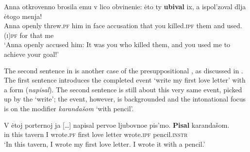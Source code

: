 \documentclass[output=paper,modfonts,newtxmath,hidelinks]{langscibook}
\begin{document}
\ea\gll	Anna otkrovenno brosila emu v lico obvinenie: \.{e}to ty \textbf{ubival} ix, a ispol'zoval dlja \.{e}togo menja!\\ 						
	Anna openly threw.\textsc{pf} him in face accusation that you killed.\textsc{ipf} them and used.\textsc{(i)pf} for that me\\
\glt	`Anna openly accused him: It was you who killed them, and you used me to achieve your goal!' \hfill \citep[after][131]{gronndiss}\label{Anna}
\z

\noindent The second sentence in  \citep[attributed to][]{forsyth70} is another case of the presuppositional , as discussed in \citet[][192f.]{gronndiss}. The first sentence introduces the completed  event `write my first love letter' with a  form (\textit{napisal}). The second sentence is still about this very same event, picked up by the  `write'; the event, however, is backgrounded and the intonational focus is on the modifier \textit{karandašom} `with pencil'.

\ea\label{love letter} \gll V \.{e}toj porternoj ja [\dots] napisal pervoe ljubovnoe pis'mo. \textbf{Pisal} karandašom.\\
in this tavern I {} wrote.\textsc{pf} first love letter 			 wrote.\textsc{ipf} pencil.\textsc{instr}\\
\glt `In this tavern, I wrote my first love letter. I wrote it with a pencil.'
\z
\end{document}
